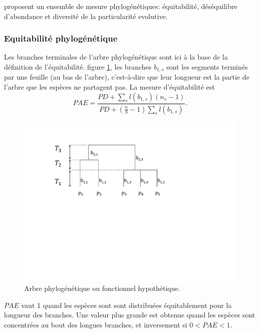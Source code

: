 \documentclass[
  11pt,
  french,
  a4paper,
  extrafontsizes,onecolumn,openright
  ]{memoir}
\begin{document}
\textcite{Cadotte2010} proposent un ensemble de mesure phylogénétiques: équitabilité, déséquilibre d'abondance et diversité de la particularité evolutive.

\subsubsection{Equitabilité phylogénétique}\label{equitabilituxe9-phyloguxe9nuxe9tique}

Les branches terminales de l'arbre phylogénétique sont ici à la base de la définition de l'équitabilité.
figure \ref{fig:ArbreA3}, les branches \(b_{1,s}\) sont les segments terminés par une feuille (au bas de l'arbre), c'est-à-dire que leur longueur est la partie de l'arbre que les espèces ne partagent pas.
La mesure d'équitabilité est
\begin{equation}
  \mathit{PAE} = \frac{\mathit{PD} + \sum_s{l(b_{1,s})(n_s-1)}}{\mathit{PD} + (\frac{n}{S}-1)\sum_s{l(b_{1,s})} }.
\end{equation}

\scriptsize

\begin{figure}

{\centering \includegraphics[width=0.8\linewidth]{images/ArbreA} 

}

\caption{Arbre phylogénétique ou fonctionnel hypothétique.}\label{fig:ArbreA3}
\end{figure}

\normalsize

\(\mathit{PAE}\) vaut 1 quand les espèces sont sont distribuées équitablement pour la longueur des branches.
Une valeur plus grande est obtenue quand les espèces sont concentrées au bout des longues branches, et inversement si \(0<\mathit{PAE}<1\).
\end{document}
